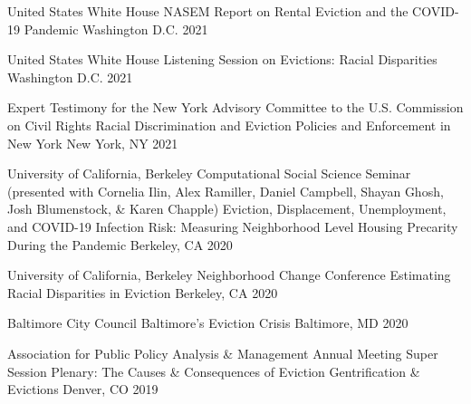 


\begin{cventries}

  \cventry
    {United States White House} %
    {NASEM Report on Rental Eviction and the COVID-19 Pandemic} %
    {Washington D.C.} %
    {2021} %
    {}

  \cventry
    {United States White House} %
    {Listening Session on Evictions: Racial Disparities} %
    {Washington D.C.} %
    {2021} %
    {}

  \cventry
    {Expert Testimony for the New York Advisory Committee to the U.S. Commission on Civil Rights} %
    {Racial Discrimination and Eviction Policies and Enforcement in New York} %
    {New York, NY} %
    {2021} %
    {}

  \cventry
    {University of California, Berkeley Computational Social Science Seminar (presented with Cornelia Ilin, Alex Ramiller, Daniel Campbell, Shayan Ghosh, Josh Blumenstock, \& Karen Chapple)} %
    {Eviction, Displacement, Unemployment, and COVID-19 Infection Risk: Measuring Neighborhood Level Housing Precarity During the Pandemic} %
    {Berkeley, CA} %
    {2020} %
    {}

  \cventry
    {University of California, Berkeley Neighborhood Change Conference} %
    {Estimating Racial Disparities in Eviction} %
    {Berkeley, CA} %
    {2020} %
    {}

  \cventry
    {Baltimore City Council} %
    {Baltimore's Eviction Crisis} %
    {Baltimore, MD} %
    {2020} %
    {}

  \cventry
    {Association for Public Policy Analysis \& Management Annual Meeting Super Session Plenary: The Causes \& Consequences of Eviction} %
    {Gentrification \& Evictions} %
    {Denver, CO} %
    {2019} %
    {}


\end{cventries}
